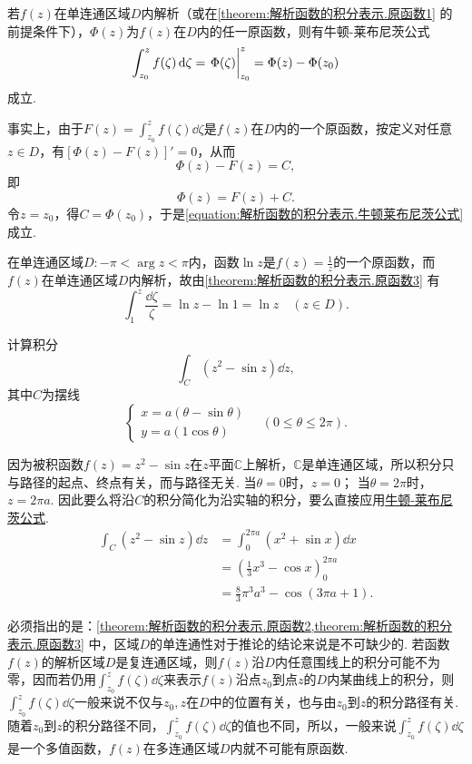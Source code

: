 \begin{corollary}\label{theorem:解析函数的积分表示.原函数3}
若\(f(z)\)在单连通区域\(D\)内解析（或在\cref{theorem:解析函数的积分表示.原函数1} 的前提条件下），\(\Phi(z)\)为\(f(z)\)在\(D\)内的任一原函数，则有牛顿-莱布尼茨公式\begin{equation}\label{equation:解析函数的积分表示.牛顿莱布尼茨公式}
\int_{z_0}^z f(\zeta) \dd{\zeta}
= \eval{\Phi(\zeta)}_{z_0}^z
= \Phi(z)-\Phi(z_0)
\end{equation}成立.
\end{corollary}
事实上，由于\(F(z) = \int_{z_0}^z f(\zeta) \dd{\zeta}\)是\(f(z)\)在\(D\)内的一个原函数，按定义对任意\(z \in D\)，有\([\Phi(z) - F(z)]'=0\)，从而\[
\Phi(z) - F(z) = C,
\]即\[
\Phi(z) = F(z) + C.
\]令\(z=z_0\)，得\(C = \Phi(z_0)\)，于是\cref{equation:解析函数的积分表示.牛顿莱布尼茨公式} 成立.

\begin{example}
在单连通区域\(D: -\pi<\arg z<\pi\)内，函数\(\ln z\)是\(f(z) = \frac{1}{z}\)的一个原函数，而\(f(z)\)在单连通区域\(D\)内解析，故由\cref{theorem:解析函数的积分表示.原函数3} 有\[
\int_1^z \frac{\dd{\zeta}}{\zeta}
= \ln z - \ln 1
= \ln z \quad(z \in D).
\]
\end{example}

\begin{example}
计算积分\[
\int_C (z^2 - \sin z) \dd{z},
\]其中\(C\)为摆线\[
\left\{ \begin{array}{l}
x = a(\theta-\sin\theta) \\
y = a(1\cos\theta)
\end{array} \right.
\quad(0\leqslant\theta\leqslant2\pi).
\]
\begin{solution}
因为被积函数\(f(z) = z^2 - \sin z\)在\(z\)平面\(\mathbb{C}\)上解析，\(\mathbb{C}\)是单连通区域，所以积分只与路径的起点、终点有关，而与路径无关.
当\(\theta=0\)时，\(z=0\)；
当\(\theta=2\pi\)时，\(z=2\pi a\).
因此要么将沿\(C\)的积分简化为沿实轴的积分，要么直接应用\hyperref[equation:解析函数的积分表示.牛顿莱布尼茨公式]{牛顿-莱布尼茨公式}.
\begin{align*}
\int_C (z^2 - \sin z) \dd{z}
&= \int_0^{2\pi a} (x^2 + \sin x) \dd{x} \\
&= \left(\frac{1}{3} x^3 - \cos x\right)_0^{2\pi a} \\
&= \frac{8}{3} \pi^3 a^3 - \cos(3\pi a+1).
\end{align*}
\end{solution}
\end{example}

必须指出的是：\cref{theorem:解析函数的积分表示.原函数2,theorem:解析函数的积分表示.原函数3} 中，区域\(D\)的单连通性对于推论的结论来说是不可缺少的.
若函数\(f(z)\)的解析区域\(D\)是复连通区域，则\(f(z)\)沿\(D\)内任意围线上的积分可能不为零，因而若仍用\(\int_{z_0}^z f(\zeta) \dd{\zeta}\)来表示\(f(z)\)沿点\(z_0\)到点\(z\)的\(D\)内某曲线上的积分，则\(\int_{z_0}^z f(\zeta) \dd{\zeta}\)一般来说不仅与\(z_0,z\)在\(D\)中的位置有关，也与由\(z_0\)到\(z\)的积分路径有关.
随着\(z_0\)到\(z\)的积分路径不同，\(\int_{z_0}^z f(\zeta) \dd{\zeta}\)的值也不同，所以，一般来说\(\int_{z_0}^z f(\zeta) \dd{\zeta}\)是一个多值函数，\(f(z)\)在多连通区域\(D\)内就不可能有原函数.

